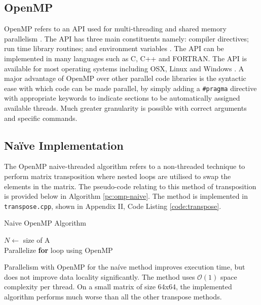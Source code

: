 \documentclass[10 pt, conference]{cssconf}
\begin{document}
\begin{multicols}{2}
\section{OpenMP}
OpenMP refers to an API used for multi-threading and shared memory parallelism \cite{OpenMP:URL}. The API has three main constituents namely: compiler directives; run time library routines; and environment variables \cite{OpenMP:URL}. The API can be implemented in many languages such as C, C++ and FORTRAN. The API is available for most operating systems including OSX, Linux and Windows \cite{OpenMP:URL}. 
A major advantage of OpenMP over other parallel code libraries is the syntactic ease with which code can be made parallel, by simply adding a \verb|#pragma| directive with appropriate keywords to indicate sections to be automatically assigned available threads. Much greater granularity is possible with correct arguments and specific commands.

\subsection{Na\"ive Implementation}
The OpenMP naive-threaded algorithm refers to a non-threaded technique to perform matrix transposition where nested loops are utilised to swap the elements in the matrix. The pseudo-code relating to this method of transposition is provided below in Algorithm \ref{pc:omp-naive}. The method is implemented in \verb|transpose.cpp|, shown in Appendix II, Code Listing \ref{code:transpose}.

\vspace{5pt}
\begin{algorithm}[H]
    \small
    \caption{Naive OpenMP Algorithm}\label{pc:omp-naive}
    	\SetAlgoLined
	$N \leftarrow$ size of A \\
	Parallelize \textbf{for} loop using OpenMP \\
	\vspace{3pt}
\end{algorithm}%
\vspace{5pt}

Parallelism with OpenMP for the na\'ive method improves execution time, but does not improve data locality significantly. The method uses $\mathcal{O}(1)$ space complexity per thread. On a small matrix of size 64x64, the implemented algorithm performs much worse than all the other transpose methods.


\end{multicols}
\end{document}
